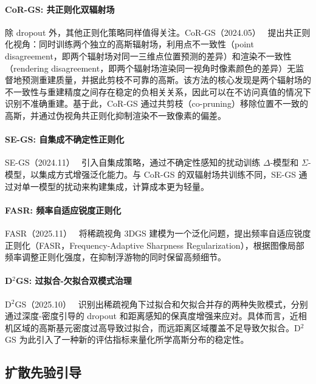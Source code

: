\paragraph{CoR-GS: 共正则化双辐射场}

除 dropout 外，其他正则化策略同样值得关注。CoR-GS（2024.05）~\cite{2405_12110} 提出共正则化视角：同时训练两个独立的高斯辐射场，利用点不一致性（point disagreement，即两个辐射场对同一三维点位置预测的差异）和渲染不一致性（rendering disagreement，即两个辐射场渲染同一视角时像素颜色的差异）无监督地预测重建质量，并据此剪枝不可靠的高斯。该方法的核心发现是两个辐射场的不一致性与重建精度之间存在稳定的负相关关系，因此可以在不访问真值的情况下识别不准确重建。基于此，CoR-GS 通过共剪枝（co-pruning）移除位置不一致的高斯，并通过伪视角共正则化抑制渲染不一致像素的偏差。

\paragraph{SE-GS: 自集成不确定性正则化}

SE-GS（2024.11）~\cite{2411_00144} 引入自集成策略，通过不确定性感知的扰动训练 $\Delta$-模型和 $\Sigma$-模型，以集成方式增强泛化能力。与 CoR-GS 的双辐射场共训练不同，SE-GS 通过对单一模型的扰动来构建集成，计算成本更为轻量。

\paragraph{FASR: 频率自适应锐度正则化}

FASR（2025.11）~\cite{2511_17918} 将稀疏视角 3DGS 建模为一个泛化问题，提出频率自适应锐度正则化（FASR，Frequency-Adaptive Sharpness Regularization），根据图像局部频率调整正则化强度，在抑制浮游物的同时保留高频细节。

\paragraph{D\texorpdfstring{$^2$}{2}GS: 过拟合-欠拟合双模式治理}

D$^2$GS（2025.10）~\cite{2510_08566} 识别出稀疏视角下过拟合和欠拟合并存的两种失败模式，分别通过深度-密度引导的 dropout 和距离感知的保真度增强来应对。具体而言，近相机区域的高斯基元密度过高导致过拟合，而远距离区域覆盖不足导致欠拟合。D$^2$GS 为此引入了一种新的评估指标来量化所学高斯分布的稳定性。

\subsection{扩散先验引导}
\label{ss:12_1b}

